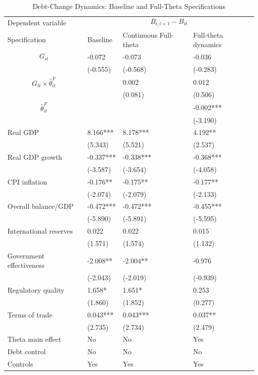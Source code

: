 \begin{table}[H]\centering
\begin{threeparttable}
\caption{Debt-Change Dynamics: Baseline and Full-Theta Specifications}
\label{tab:debt_change_combined_fulltheta}
\scriptsize
\begin{tabularx}{\textwidth}{lYYY}
\toprule
Dependent variable &  \\
\cmidrule(lr){2-4}
Specification & Baseline & Continuous Full-theta & Full-theta dynamics \\
\midrule
$$G_{it}$$ & -0.072 & -0.073 & -0.036 \\
 & (-0.555) & (-0.568) & (-0.283) \\
$$G_{it}\times\widehat{\theta}^{F}_{it}$$ &  & 0.002 & 0.012 \\
 &  & (0.081) & (0.506) \\
$$\widehat{\theta}^{F}_{it}$$ &  &  & -0.002*** \\
 &  &  & (-3.190) \\
Real GDP & 8.166*** & 8.178*** & 4.192** \\
 & (5.343) & (5.521) & (2.537) \\
Real GDP growth & -0.337*** & -0.338*** & -0.368*** \\
 & (-3.587) & (-3.654) & (-4.058) \\
CPI inflation & -0.176** & -0.175** & -0.177** \\
 & (-2.074) & (-2.079) & (-2.133) \\
Overall balance/GDP & -0.472*** & -0.472*** & -0.455*** \\
 & (-5.890) & (-5.891) & (-5.595) \\
International reserves & 0.022 & 0.022 & 0.015 \\
 & (1.571) & (1.574) & (1.132) \\
Government effectiveness & -2.008** & -2.004** & -0.976 \\
 & (-2.043) & (-2.019) & (-0.939) \\
Regulatory quality & 1.658* & 1.651* & 0.253 \\
 & (1.860) & (1.852) & (0.277) \\
Terms of trade & 0.043*** & 0.043*** & 0.037** \\
 & (2.735) & (2.734) & (2.479) \\
\midrule
Theta main effect & No & No & Yes \\
Debt control & No & No & No \\
Controls & Yes & Yes & Yes \\

\end{tabularx}
\end{threeparttable}
\end{table}
